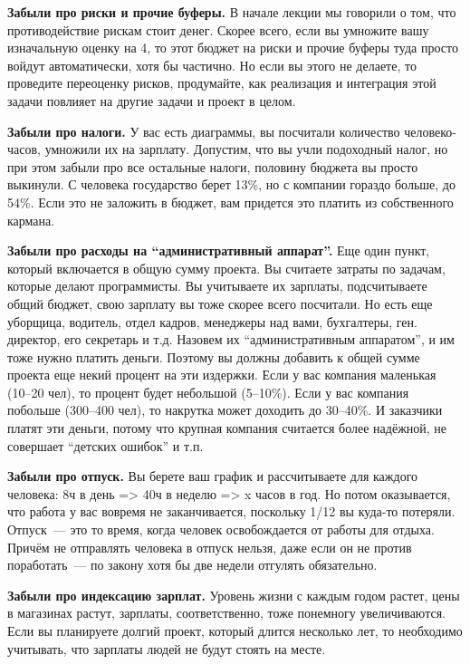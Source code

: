 \documentclass{../../text-style}
\begin{document}
\textbf{Забыли про риски и прочие буферы.} В начале лекции мы говорили о том, что противодействие рискам стоит денег. Скорее всего, если вы умножите вашу изначальную оценку на 4, то этот бюджет на риски и прочие буферы туда просто войдут автоматически, хотя бы частично. Но если вы этого не делаете, то проведите переоценку рисков, продумайте, как реализация и интеграция этой задачи повлияет на другие задачи и проект в целом.

\textbf{Забыли про налоги.} У вас есть диаграммы, вы посчитали количество человеко-часов, умножили их на зарплату. Допустим, что вы учли подоходный налог, но при этом забыли про все остальные налоги, половину бюджета вы просто выкинули. С человека государство берет 13\%, но с компании гораздо больше, до 54\%. Если это не заложить в бюджет, вам придется это платить из собственного кармана.

\textbf{Забыли про расходы на \enquote{административный аппарат}.} Еще один пункт, который включается в общую сумму проекта. Вы считаете затраты по задачам, которые делают программисты. Вы учитываете их зарплаты, подсчитываете общий бюджет, свою зарплату вы тоже скорее всего посчитали. Но есть еще уборщица, водитель, отдел кадров, менеджеры над вами, бухгалтеры, ген. директор, его секретарь и т.д. Назовем их \enquote{административным аппаратом}, и им тоже нужно платить деньги. Поэтому вы должны добавить к общей сумме проекта еще некий процент на эти издержки. Если у вас компания маленькая (10–20 чел), то процент будет небольшой (5–10\%). Если у вас компания побольше (300–400 чел), то накрутка может доходить до 30–40\%. И заказчики платят эти деньги, потому что крупная компания считается более надёжной, не совершает \enquote{детских ошибок} и т.п.

\textbf{Забыли про отпуск.} Вы берете ваш график и рассчитываете для каждого человека: 8ч в день => 40ч в неделю => x часов в год. Но потом оказывается, что работа у вас вовремя не заканчивается, поскольку 1/12 вы куда-то потеряли. Отпуск~--- это то время, когда человек освобождается от работы для отдыха. Причём не отправлять человека в отпуск нельзя, даже если он не против поработать~--- по закону хотя бы две недели отгулять обязательно.

\textbf{Забыли про индексацию зарплат.} Уровень жизни с каждым годом растет, цены в магазинах растут, зарплаты, соответственно, тоже понемногу увеличиваются. Если вы планируете долгий проект, который длится несколько лет, то необходимо учитывать, что зарплаты людей не будут стоять на месте. 
\end{document}
